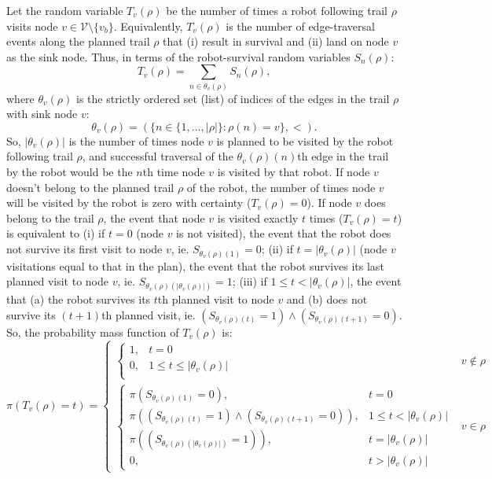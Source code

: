 \documentclass[11pt, oneside]{article}
\begin{document}
Let the random variable $T_v(\rho)$ be the number of times a robot following trail $\rho$ visits node $v\in \mathcal{V} \setminus \{v_b\}$. 
Equivalently, $T_v(\rho)$ is the number of edge-traversal events along the planned trail $\rho$ that (i) result in survival and (ii) land on node $v$ as the sink node. 
Thus, in terms of the robot-survival random variables $S_n(\rho)$:
\begin{equation}
	T_v(\rho) = \sum_{n \in \theta_v(\rho) } S_n(\rho), %
\end{equation}
where $\theta_v(\rho)$ is the strictly ordered set (list) of indices of the edges in the trail $\rho$ with sink node $v$:
\begin{equation}
	\theta_v(\rho) = (\{ n \in \{1, ..., \lvert \rho \rvert\} : \rho(n) = v\}, <).
\end{equation} So, $\lvert \theta_v(\rho) \rvert$ is the number of times node $v$ is planned to be visited by the robot following trail $\rho$, and successful traversal of the $\theta_v(\rho)(n)$th edge in the trail by the robot would be the $n$th time node $v$ is visited by that robot.
If node $v$ doesn't belong to the planned trail $\rho$ of the robot, the number of times node $v$ will be visited by the robot is zero with certainty ($T_v(\rho)=0$).
If node $v$ does belong to the trail $\rho$, the event that node $v$ is visited exactly $t$ times ($T_v(\rho)=t$) is equivalent to
(i) if $t=0$ (node $v$ is not visited), the event that the robot does not survive its first visit to node $v$, ie. $S_{\theta_v(\rho)(1)}=0$;
(ii) if $t=\lvert \theta_v(\rho)\rvert$ (node $v$ visitations equal to that in the plan), the event that the robot survives its last planned visit to node $v$, ie. $S_{\theta_v(\rho)(\lvert \theta_v(\rho) \rvert)}=1$;
(iii) if $1 \leq t < \lvert \theta_v(\rho ) \rvert$, the event that (a) the robot survives its $t$th planned visit to node $v$ and (b) does not survive its $(t+1)$th planned visit, ie. $(S_{\theta_v(\rho)(t)}=1) \land (S_{\theta_v(\rho)(t+1)}=0)$. So, the probability mass function of $T_v(\rho)$ is:
\begin{equation}
	\pi(T_v(\rho) = t ) = 
	\begin{cases}
		\begin{cases}
			1, & t = 0 \\
			0, & 1 \leq t \leq \lvert \theta_v(\rho ) \rvert  \\
		\end{cases}
		&  v \notin \rho \\
		\begin{cases}
			\pi(S_{\theta_v(\rho)(1)}=0), & t = 0 \\
			\pi\left( (S_{\theta_v(\rho)(t)}=1) \land (S_{\theta_v(\rho)(t+1)}=0)\right), &1 \leq t < \lvert \theta_v(\rho ) \rvert   \\
			\pi\left( (S_{\theta_v(\rho)(\lvert \theta_v(\rho) \rvert)}=1) \right), & t = \lvert \theta_v(\rho ) \rvert   \\
			0 , & t >  \lvert \theta_v(\rho ) \rvert
		\end{cases}
		& v \in \rho
	\end{cases}
\end{equation}
\end{document}
